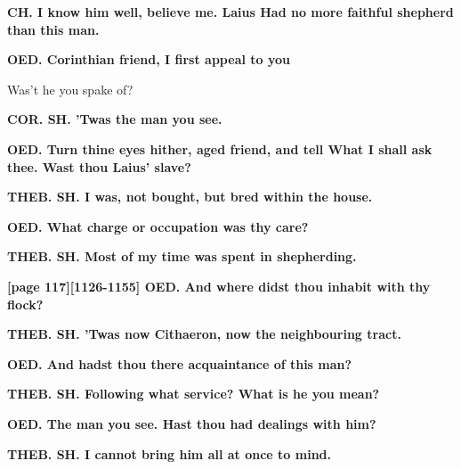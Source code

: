 \documentclass[11pt,letter]{book}
\begin{document}
\par \textbf{CH. I know him well, believe me. Laius Had no more faithful shepherd than this man.}
\par 

\par \textbf{OED. Corinthian friend, I first appeal to you}
\par   Was’t he you spake of?

\par \textbf{COR. SH. ’Twas the man you see.}
\par 

\par \textbf{OED. Turn thine eyes hither, aged friend, and tell What I shall ask thee. Wast thou Laius’ slave?}
\par 

\par \textbf{THEB. SH. I was, not bought, but bred within the house.}
\par 

\par \textbf{OED. What charge or occupation was thy care?}
\par 

\par \textbf{THEB. SH. Most of my time was spent in shepherding.}
\par 

\par \textbf{[page 117][1126-1155] OED. And where didst thou inhabit with thy flock?}
\par 

\par \textbf{THEB. SH. ’Twas now Cithaeron, now the neighbouring tract.}
\par 

\par \textbf{OED. And hadst thou there acquaintance of this man?}
\par 

\par \textbf{THEB. SH. Following what service? What is he you mean?}
\par 

\par \textbf{OED. The man you see. Hast thou had dealings with him?}
\par 

\par \textbf{THEB. SH. I cannot bring him all at once to mind.}
\par 
\end{document}
